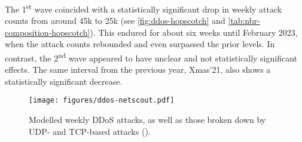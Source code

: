 \documentclass[letterpaper,twocolumn,10pt]{article}
\begin{document}
 The 1\textsuperscript{st} wave coincided with a statistically significant drop in weekly attack counts from around 45k to 25k (see \autoref{fig:ddos-hopscotch} and \autoref{tab:nbr-composition-hopscotch}). This endured for about six weeks until February 2023, when the attack counts rebounded and even surpassed the prior levels. In contrast, the 2\textsuperscript{nd} wave appeared to have unclear and not statistically significant effects. The same interval from the previous year, Xmas'21, also shows a statistically significant decrease.

\begin{figure}[t]
    \centering
    \texttt{[image: figures/ddos-netscout.pdf]}\\
    \caption{Modelled weekly DDoS attacks, as well as those broken down by UDP- and TCP-based attacks (\netscout).}
    \label{fig:ddos-netscout}
\end{figure}
\end{document}
